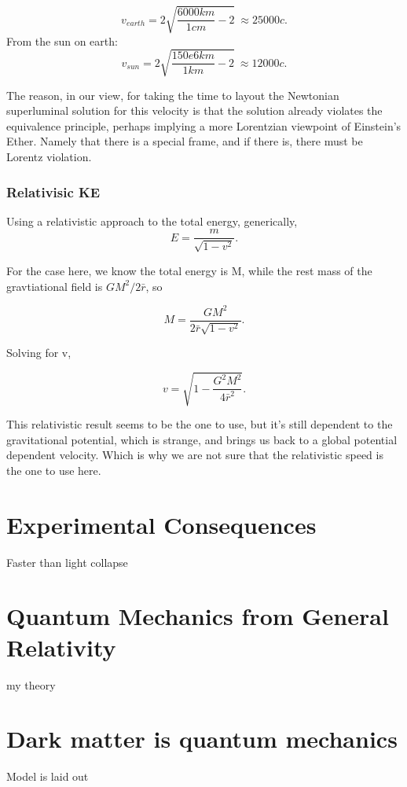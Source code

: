 \documentclass[../rzero]{subfiles}
\begin{document}
\begin{equation}
 v_{earth} = 2 \sqrt{\frac{6000km}{1 cm} - 2} \ \approx 25000c .
\end{equation}
From the sun on earth:
\begin{equation}
 v_{sun} = 2 \sqrt{\frac{150e6km}{1 km} - 2} \ \approx 12000c .
\end{equation}

The reason, in our view, for taking the time to layout the Newtonian superluminal solution for this velocity is that the solution already violates the equivalence principle, perhaps implying a more Lorentzian viewpoint  of Einstein's Ether\cite{Einstein1920}. Namely that there is a special frame, and if there is, there must be Lorentz violation.  


\subsubsection{Relativisic KE}
Using a relativistic approach to the total energy, generically, 
\begin{equation}
 E = \frac{m}{\sqrt{1 - v^2}}.
\end{equation}

For the case here, we know the total energy is M, while the rest mass of the gravtiational field is $GM^2/2 \bar r $, so

\begin{equation}
 M = \frac{GM^2}{2 \bar r \sqrt{1 - v^2}}.
\end{equation}

Solving for v, 

\begin{equation}
 v = \sqrt{1 - \frac{G^2M^2}{4\bar r^2}}.
\end{equation}



This relativistic result seems to be the one to use, but it's still dependent to the gravitational potential, which is strange, and brings us back to a global potential dependent velocity. Which is why we are not sure that the relativistic speed is the one to use here. 

\section{Experimental Consequences}
Faster than light collapse



\section{Quantum Mechanics from General Relativity}
my theory


\section{Dark matter is quantum mechanics}
	Model is laid out 
\end{document}
